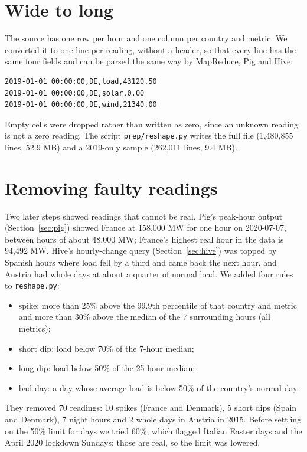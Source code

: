 \documentclass[12pt,a4paper]{report}
\begin{document}
\section{Wide to long}
The source has one row per hour and one column per country and metric. We converted it to one line per reading, without a header, so that every line has the same four fields and can be parsed the same way by MapReduce, Pig and Hive:
\begin{lstlisting}
2019-01-01 00:00:00,DE,load,43120.50
2019-01-01 00:00:00,DE,solar,0.00
2019-01-01 00:00:00,DE,wind,21340.00
\end{lstlisting}
Empty cells were dropped rather than written as zero, since an unknown reading is not a zero reading. The script \texttt{prep/reshape.py} writes the full file (1,480,855 lines, 52.9 MB) and a 2019-only sample (262,011 lines, 9.4 MB).

\section{Removing faulty readings}
Two later steps showed readings that cannot be real. Pig's peak-hour output (Section~\ref{sec:pig}) showed France at 158,000 MW for one hour on 2020-07-07, between hours of about 48,000 MW; France's highest real hour in the data is 94,492 MW. Hive's hourly-change query (Section~\ref{sec:hive}) was topped by Spanish hours where load fell by a third and came back the next hour, and Austria had whole days at about a quarter of normal load. We added four rules to \texttt{reshape.py}:
\begin{itemize}
\item spike: more than 25\% above the 99.9th percentile of that country and metric and more than 30\% above the median of the 7 surrounding hours (all metrics);
\item short dip: load below 70\% of the 7-hour median;
\item long dip: load below 50\% of the 25-hour median;
\item bad day: a day whose average load is below 50\% of the country's normal day.
\end{itemize}
They removed 70 readings: 10 spikes (France and Denmark), 5 short dips (Spain and Denmark), 7 night hours and 2 whole days in Austria in 2015. Before settling on the 50\% limit for days we tried 60\%, which flagged Italian Easter days and the April 2020 lockdown Sundays; those are real, so the limit was lowered.

\end{document}
